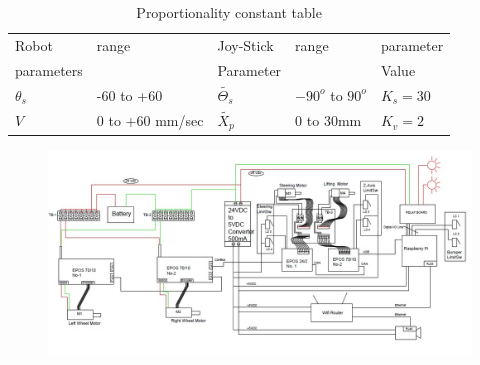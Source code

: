 \begin{table}[!htbp]
	\caption{Proportionality constant table}
	\centering
	\begin{tabular}{l l l l l}
		\hline
		Robot  & range & Joy-Stick& range & parameter \\
		parameters& & Parameter & & Value\\
		\hline
		$\theta_s$ & -60 to +60 & $\tilde{\Theta_s}$ & $-90^o$ to $90^o$ & $K_s=30$\\
		$V$ & 0 to +60 mm/sec & $\tilde{X_p}$ & 0 to 30mm & $K_v=2$\\
		\hline
	\end{tabular}	
\end{table}

\begin{figure}
	\includegraphics[width=\linewidth,keepaspectratio]{Chapter5/fig/RobotSideWiring}
	\label{fig:wiring} 
\end{figure} 
